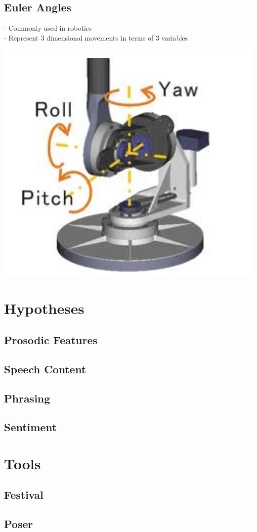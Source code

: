 \documentclass[bsc,frontabs,twoside,singlespacing,parskip]{infthesis}
\begin{document}
\subsection{Euler Angles}
- Commonly used in robotics \\
- Represent 3 dimensional movements in terms of 3 variables\\

\begin{center}
	\includegraphics[width=.5\textwidth]{euler_angles.png}
\end{center}
\section{Hypotheses}
\subsection{Prosodic Features}
\subsection{Speech Content}
\subsection{Phrasing}
\subsection{Sentiment}
\section{Tools}
\subsection{Festival}
\subsection{Poser}
\end{document}
